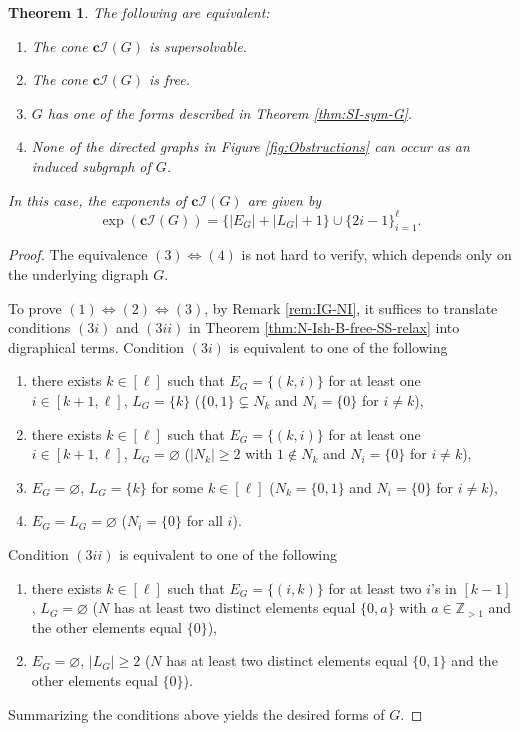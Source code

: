 \documentclass[11pt]{article}
\newtheorem{theorem}[theo]{Theorem}
\theoremstyle{definition}
\numberwithin{equation}{section}
\newcommand{\I}{\mathcal{I}}
\newcommand{\Z}{\mathbb{Z}}
\newcommand{\tbf}{\textbf}
\begin{document}
   \begin{theorem}
 \label{thm:IG}
The following are equivalent:
 \begin{enumerate}[(1)]
\item  The cone $\tbf{c}\I(G)$ is supersolvable.
\item The cone $\tbf{c}\I(G)$  is  free.
\item $G$ has one of the forms described in Theorem  \ref{thm:SI-sym-G}.
\item None of the directed graphs in Figure \ref{fig:Obstructions} can occur as an induced subgraph of $G$.
\end{enumerate}
In this case, the exponents of   $\tbf{c}\I(G)$ are   given by 
$$ \exp(\tbf{c}\I(G)) = \{|E_G|+|L_G|+1\} \cup \{2i-1\}_{i=1}^\ell.$$
 \end{theorem}
 
 \begin{proof}
 The equivalence $(3) \Leftrightarrow (4)$ is not hard to verify, which depends only on the underlying digraph $G$. 
 
 To prove $(1) \Leftrightarrow (2) \Leftrightarrow (3)$, by Remark \ref{rem:IG-NI}, it suffices to translate conditions $(3i)$ and $(3ii)$ in Theorem \ref{thm:N-Ish-B-free-SS-relax} into digraphical terms. 
Condition $(3i)$ is equivalent to one of the following 
 \begin{enumerate}
 \item[$(a')$]  there exists $k\in[\ell]$ such that $E_G=\{(k,i)  \}$ for at least one $i \in [k+1,\ell]$, $L_G =\{k\}$ ($ \{0,1\} \subsetneq N_k$ and $N_i = \{0\}$ for $i\ne k$), 
\item[$(a'')$]   there exists $k\in[\ell]$ such that $E_G=\{(k,i)  \}$ for at least one $i \in [k+1,\ell]$, $L_G =\varnothing$ ($|N_k|\ge 2$ with $1 \notin N_k$  and $N_i = \{0\}$ for $i\ne k$),
\item[$(c')$] $E_G=\varnothing$, $L_G =\{k\}$ for some $k\in[\ell]$ ($N_k = \{0,1\}$ and $N_i = \{0\}$ for $i\ne k$),  
\item[$(c'')$] $E_G=L_G =\varnothing$ ($N_i = \{0\}$ for all $i$). 
\end{enumerate}
Condition $(3ii)$ is equivalent to one of the following
 \begin{enumerate}
 \item[$(b)$]  there exists $k\in[\ell]$ such that $E_G=\{(i,k) \}$ for at least two $i$'s in $[k-1]$, $L_G =\varnothing$ 
 ($N$ has at least two distinct elements equal $\{0,a\}$ with $a \in\Z_{>1}$ and the other elements equal $\{0\}$), 
\item[$(c''')$] $E_G=\varnothing$, $|L_G|\ge2$  ($N$ has at least two distinct elements equal $\{0,1\}$  and the other elements equal $\{0\}$). 
\end{enumerate}
Summarizing the conditions above yields the desired forms of $G$.
\end{proof}
\end{document}
